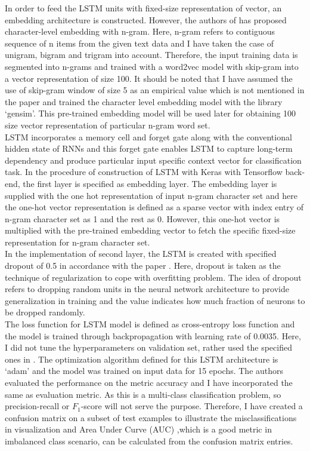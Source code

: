 \documentclass[a4paper]{article}
\begin{document}
In order to feed the LSTM units with fixed-size representation of vector, an embedding architecture is constructed. However, the authors of \cite{lee2017name} has proposed character-level embedding with n-gram. Here, n-gram refers to contiguous sequence of n items from the given text data and I have taken the case of unigram, bigram and trigram into account. Therefore, the input training data is segmented into n-grams and trained with a word2vec model with skip-gram into a vector representation of size 100. It should be noted that I have assumed the use of skip-gram window of size 5 as an empirical value which is not mentioned in the paper \cite{lee2017name} and trained the character level embedding model with the library `gensim'. This pre-trained embedding model will be used later for obtaining 100 size vector representation of particular n-gram word set.
\\

LSTM incorporates a memory cell and forget gate along with the conventional hidden state of RNNs and this forget gate enables LSTM to capture long-term dependency and produce particular input specific context vector for classification task. In the procedure of construction of LSTM with Keras with Tensorflow back-end, the first layer is specified as embedding layer. The embedding layer is supplied with the one hot representation of input n-gram character set and here the one-hot vector representation is defined as a sparse vector with index entry of n-gram character set as 1 and the rest as 0. However, this one-hot vector is multiplied with the pre-trained embedding vector to fetch the specific fixed-size representation for n-gram character set.
\\

In the implementation of second layer, the LSTM is created with specified dropout of 0.5 in accordance with the paper \cite{lee2017name}. Here, dropout is taken as the technique of regularization to cope with overfitting problem. The idea of dropout refers to dropping random units in the neural network architecture to provide generalization in training and the value indicates how much fraction of neurons to be dropped randomly.
\\

The loss function for LSTM model is defined as cross-entropy loss function and the model is trained through backpropagation with learning rate of 0.0035. Here, I did not tune the hyperparameters on validation set, rather used the specified ones in \cite{lee2017name}. The optimization algorithm defined for this LSTM architecture is `adam' and the model was trained on input data for 15 epochs. The authors evaluated the performance on the metric accuracy and I have incorporated the same as evaluation metric. As this is a multi-class classification problem, so precision-recall or $ F_{1} $-score will not serve the purpose. Therefore, I have created a confusion matrix on a subset of test examples to illustrate the misclassifications in visualization and Area Under Curve (AUC) ,which is a good metric in imbalanced class scenario, can be calculated from the confusion matrix entries.
\end{document}
